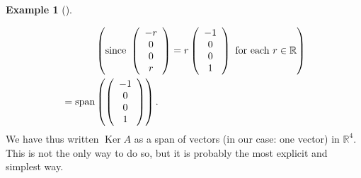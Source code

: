 \documentclass[numbers=enddot,12pt,final,onecolumn,notitlepage]{scrartcl}%
\theoremstyle{definition}
\newtheorem{exam}[theo]{Example}
\newenvironment{example}[1][]
{\begin{exam}[#1]\begin{leftbar}}
{\end{leftbar}\end{exam}}
\begin{document}
\begin{example}
\begin{align}
&  \ \ \ \ \ \ \ \ \ \ \left(  \text{since }\left(
\begin{array}
[c]{c}%
-r\\
0\\
0\\
r
\end{array}
\right)  =r\left(
\begin{array}
[c]{c}%
-1\\
0\\
0\\
1
\end{array}
\right)  \text{ for each }r\in\mathbb{R}\right) \nonumber\\
&  =\operatorname{span}\left(  \left(
\begin{array}
[c]{c}%
-1\\
0\\
0\\
1
\end{array}
\right)  \right)  .\nonumber
\end{align}
We have thus written $\operatorname*{Ker}A$ as a span of vectors (in our case:
one vector) in $\mathbb{R}^{4}$. This is not the only way to do so, but it is
probably the most explicit and simplest way.
\end{example}
\end{document}
